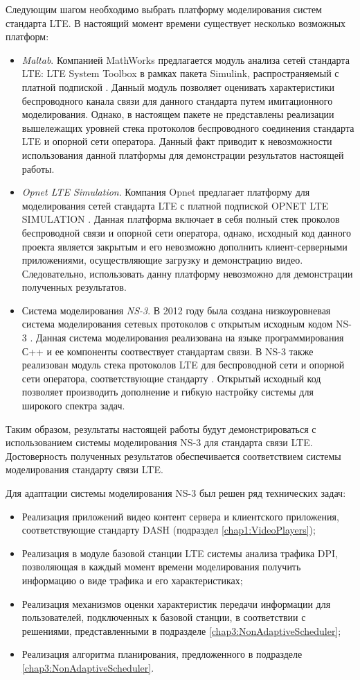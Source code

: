 Следующим шагом необходимо выбрать платформу моделирования систем стандарта LTE. В настоящий момент времени существует несколько возможных платформ:
\begin{itemize}
	\item \textit{Maltab}. Компанией MathWorks предлагается модуль анализа сетей стандарта LTE: LTE System Toolbox в рамках пакета Simulink, распространяемый с платной подпиской \cite{Matlab}. Данный модуль позволяет оценивать характеристики беспроводного канала связи для данного стандарта путем имитационного моделирования. Однако, в настоящем пакете не представлены реализации вышележащих уровней стека протоколов беспроводного соединения стандарта LTE и опорной сети оператора. Данный факт приводит к невозможности использования данной платформы для демонстрации результатов настоящей работы.
	\item \textit{Opnet LTE Simulation}. Компания Opnet предлагает платформу для моделирования сетей стандарта LTE с платной подпиской OPNET LTE SIMULATION \cite{Opnet}. Данная платформа включает в себя полный стек проколов беспроводной связи и опорной сети оператора, однако, исходный код данного проекта является закрытым и его невозможно дополнить клиент-серверными приложениями, осуществляющие загрузку и демонстрацию видео. Следовательно, использовать данну платформу невозможно для демонстрации полученных результатов.
	\item Система моделирования \textit{NS-3}. В 2012 году была создана низкоуровневая система моделирования сетевых протоколов с открытым исходным кодом NS-3 \cite{ns-3}. Данная система моделирования реализована на языке программирования С++ и ее компоненты соотвествует стандартам связи. В NS-3 также реализован модуль стека протоколов LTE для беспроводной сети и опорной сети оператора, соответствующие стандарту \cite{lte_std}. Открытый исходный код позволяет производить дополнение и гибкую настройку системы для широкого спектра задач.
\end{itemize}

Таким образом, результаты настоящей работы будут демонстрироваться с использованием системы моделирования NS-3 для стандарта связи LTE. Достоверность полученных результатов обеспечивается соответствием системы моделирования стандарту связи LTE.

Для адаптации системы моделирования NS-3 был решен ряд технических задач:
\begin{itemize}
	\item Реализация приложений видео контент сервера и клиентского приложения, соответствующие стандарту DASH (подраздел \ref{chap1:VideoPlayers});
	\item Реализация в модуле базовой станции LTE системы анализа трафика DPI, позволяющая в каждый момент времени моделирования получить информацию о виде трафика и его характеристиках;
	\item Реализация механизмов оценки характеристик передачи информации для пользователей, подключенных к базовой станции, в соответствии с решениями, представленными в подразделе \ref{chap3:NonAdaptiveScheduler};
	\item Реализация алгоритма планирования, предложенного в подразделе \ref{chap3:NonAdaptiveScheduler}.
\end{itemize}

